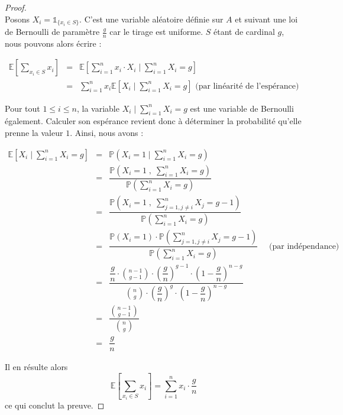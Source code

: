\documentclass[12pt,a4paper]{book}
\newcommand{\E}{\mathbb{E}}
\newcommand{\p}{\mathbb{P}}
\newcommand{\1}{\mathds{1}}
\begin{document}
	\begin{proof}
		~\\
		Posons $X_i = \1_{\{x_i \in S\}}$. C'est une variable aléatoire définie sur $A$ et suivant une loi de Bernoulli de paramètre $\frac{g}{n}$ car le tirage est uniforme. $S$ étant de cardinal $g$, nous pouvons alors écrire :
		
		\begin{eqnarray*}
			\E \left[ \sum_{x_i \in S} x_i \right] &=& \E \left[ \sum_{i=1}^n x_i \cdot X_i \; | \; \sum_{i=1}^n X_i = g \right]\\
			&=& \sum_{i=1}^n x_i \E \left[ X_i \; | \; \sum_{i=1}^n X_i = g \right]  \textrm{ (par linéarité de l'espérance)}
		\end{eqnarray*}
		
		Pour tout $1 \leq i \leq n$, la variable $X_i \; | \; \sum_{i=1}^n X_i = g$  est une variable de Bernoulli également. Calculer son espérance revient donc à déterminer la probabilité qu'elle prenne la valeur $1$. Ainsi, nous avons :
		
		\begin{eqnarray*}
			\E \left[ X_i \; | \; \sum_{i=1}^n X_i = g \right] &=& \p \left( X_i = 1 \; | \; \sum_{i=1}^n X_i = g \right) \\
			&=& \dfrac{\p \left( X_i = 1 \; , \; \displaystyle \sum_{i=1}^n X_i = g \right)}{\p \left(\displaystyle \sum_{i=1}^n X_i = g \right)} \\
			&=& \dfrac{\p \left( X_i = 1 \; , \; \displaystyle \sum_{j=1, j\neq i}^n X_j = g-1 \right)}{\p \left(\displaystyle \sum_{i=1}^n X_i = g \right)} \\
			&=& \dfrac{\p \left( X_i = 1 \right) \cdot \p \left( \displaystyle \sum_{j=1, j\neq i}^n X_j = g-1 \right)}{\p \left(\displaystyle \sum_{i=1}^n X_i = g \right)}  \quad \textrm{  (par indépendance)} \\
			&=& \dfrac{\dfrac{g}{n} \cdot \displaystyle {n-1 \choose g-1} \cdot \left(\dfrac{g}{n}\right)^{g-1} \cdot \left(1 - \dfrac{g}{n}\right)^{n-g} } {\displaystyle {n \choose g} \cdot \left(\dfrac{g}{n}\right)^{g} \cdot \left(1 - \dfrac{g}{n}\right)^{n-g} } \\
			&=& \dfrac{\displaystyle {n-1 \choose g-1}} {\displaystyle {n \choose g}} \\
			&=& \dfrac{g}{n}
		\end{eqnarray*}
		
		Il en résulte alors 
		$$
			\E \left[ \sum_{x_i \in S} x_i \right] = \sum_{i=1}^n x_i  \cdot \dfrac{g}{n}
		$$
		ce qui conclut la preuve.
	\end{proof}
\end{document}
